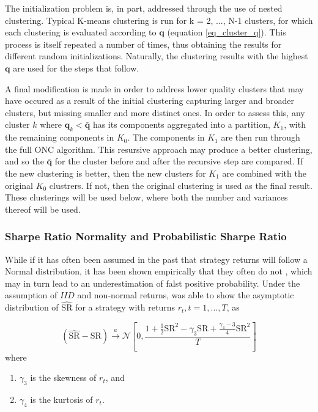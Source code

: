 \documentclass[a4paper,11pt,oneside]{article}
\theoremstyle{plain}
\theoremstyle{definition}
\begin{document}
	The initialization problem is, in part, addressed through the use of nested clustering. Typical K-means clustering is run for k = 2, ..., N-1 clusters, for which each clustering is evaluated according to $\mathbf{q}$ (equation \eqref{eq_cluster_q}). This process is itself repeated a number of times, thus obtaining the results for different random initializations. Naturally, the clustering results with the highest $\mathbf{q}$ are used for the steps that follow. \newline
	
	A final modification is made in order to address lower quality clusters that may have occured as a result of the initial clustering capturing larger and broader clusters, but missing smaller and more distinct ones. In order to assess this, any cluster $k$ where $\mathbf{q}_k < \mathbf{\bar{q}}$ has its components aggregated into a partition, $K_1$, with the remaining components in $K_0$. The components in $K_1$ are then run through the full ONC algorithm. This resursive approach may produce a better clustering, and so the  $\mathbf{\bar{q}}$  for the cluster before and after the recursive step are compared. If the new clustering is better, then the new clusters for $K_1$ are combined with the original $K_0$ clustrers. If not, then the original clustering is used as the final result. These clusterings will be used below, where both the number and variances thereof will be used.
	
	\subsubsection{Sharpe Ratio Normality and Probabilistic Sharpe Ratio}\label{sr_normality}
	
	While if it has often been assumed in the past that strategy returns will follow a Normal distribution, it has been shown empirically that they often do not \citep{Brooks}, which may in turn lead to an underestimation of falst positive probability. Under the assumption of $IID$ and non-normal returns, \citet{Mertens} was able to show the asymptotic distribution of $\widehat{\mathrm{SR}}$ for a strategy with returns $r_t , t = 1, ..., T$,  as 
	
	\begin{equation}
	(\widehat{\mathrm{SR}}-\mathrm{SR}) \stackrel{a}{\rightarrow} \mathcal{N}\left[0, \frac{1+\frac{1}{2} \mathrm{SR}^{2}-\gamma_{3} \mathrm{SR}+\frac{\gamma_{4}-3}{4}\mathrm{SR}^{2}}{T}\right]
	\end{equation}
	where
	\begin{enumerate}
		\item $\gamma_3$ is the skewness of $r_t$, and 
		\item $\gamma_4$ is the kurtosis of $r_t$.
	\end{enumerate}
\end{document}
